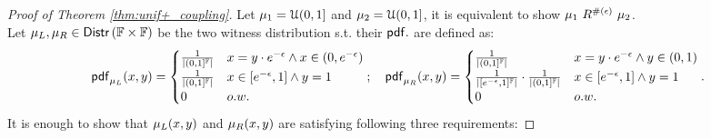 \documentclass[a4paper,11pt]{article}
\begin{document}
%
\begin{proof}[Proof of Theorem \ref{thm:unif+_coupling}]
%
Let $\edistr_1 = \muniform(0, 1]$ and $\edistr_2 = \muniform(0, 1]$, it is equivalent to show 
${\edistr_1} ~ R^{\#(\epsilon)} ~ \edistr_2$.
%
%
%
\\
%
Let $\mu_L, \mu_R \in \distr\left({\float} \times {\float}\right)$ 
be the two witness distribution s.t.
their $\pdf.$ are defined as:
{\small\[
	\mathsf{pdf}_{\mu_L}(x, y) = 
	\begin{cases}
	\frac{1}{\left \vert (0, 1]^{\mathbb{F}} \right \vert} 
	& x = y \cdot e^{-\epsilon} \land x \in (0, e^{-\epsilon})\\
	\frac{1}{\left \vert (0, 1]^{\mathbb{F}} \right \vert} 	
	& x \in [e^{-\epsilon}, 1] \land y = 1\\
	0       
	& o.w.
	\end{cases};
~~~
	\mathsf{pdf}_{\mu_R}(x, y) = 
	\begin{cases}
	\frac{1}{\left \vert (0, 1]^{\mathbb{F}} \right \vert}	
	& x = y \cdot e^{-\epsilon} \land y \in (0, 1)\\
	\frac{1}{\left \vert [e^{-\epsilon}, 1]^{\mathbb{F}} \right \vert} \cdot \frac{1}{\left \vert (0, 1]^{\mathbb{F}} \right \vert}
	& x \in [e^{-\epsilon}, 1] \land y = 1\\
	0       & o.w.
	\end{cases}.
\]
}
It is enough to show that $\edistr_L(x, y)$ and $\edistr_R(x, y)$ are satisfying following three requirements:
\begin{itemize}
	\item $\supp(\mu_L) \subseteq R \land \supp(\mu_R) \subseteq R$
%
\\
%
Let $R' =
		\left \{(\varx, \vary) \in (0, 1]^{\float} \times (0, 1]^{\float} 
		~|~
		(\varx \in (0, e^{-\epsilon}) \imply \vary =  e^{\epsilon}  \varx)
		\land
		(\varx \in [e^{-\epsilon}, 1] \imply \vary = 1 )
		\right \}$.
		\\
		Since this implies $
		\forall \rvalL, \rvalR \in (0,1]^{\real}. (

\end{itemize}
\end{proof}
\end{document}
